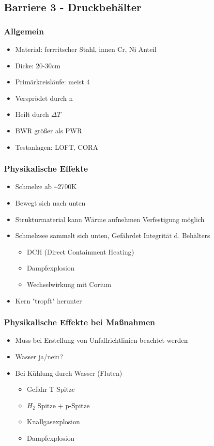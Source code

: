 \documentclass[12pt]{article}
\begin{document}
\subsection{Barriere 3 - Druckbehälter}

\subsubsection{Allgemein}
\begin{itemize}
  \item Material: ferrritscher Stahl, innen Cr, Ni Anteil
  \item Dicke: 20-30cm
  \item Primärkreisläufe: meist 4
  \item Versprödet durch n
  \item Heilt durch \(\Delta T\)
  \item BWR größer als PWR
  \item Testanlagen: LOFT, CORA
\end{itemize}

\subsubsection{Physikalische Effekte}
\begin{itemize}
  \item Schmelze ab \textasciitilde 2700K
  \item Bewegt sich nach unten
  \item Strukturmaterial kann Wärme aufnehmen \textrightarrow Verfestigung möglich
  \item Schmelzsee sammelt sich unten, Gefährdet Integrität d. Behälters
  \begin{itemize}
    \item DCH (Direct Containment Heating)
    \item Dampfexplosion
    \item Wechselwirkung mit Corium
  \end{itemize}
  \item Kern "tropft" herunter
\end{itemize}

\subsubsection{Physikalische Effekte bei Maßnahmen}
\begin{itemize}
  \item Muss bei Erstellung von Unfallrichtlinien beachtet werden
  \item Wasser ja/nein?
  \item Bei Kühlung durch Wasser (Fluten)
  \begin{itemize}
    \item Gefahr T-Spitze
    \item \(H_2\) Spitze + p-Spitze
    \item Knallgasexplosion
    \item Dampfexplosion
  \end{itemize}
\end{itemize}
\end{document}
